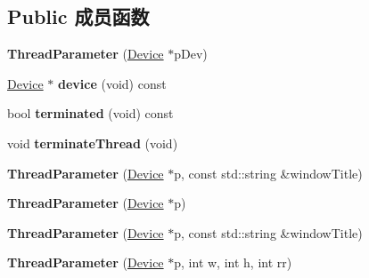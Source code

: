 \subsection*{Public 成员函数}
\begin{DoxyCompactItemize}
\item 
\hypertarget{class_thread_parameter_a6edf848dbdf591e4db2547f0054c5193}{{\bfseries Thread\+Parameter} (\hyperlink{classmv_i_m_p_a_c_t_1_1acquire_1_1_device}{Device} $\ast$p\+Dev)}\label{class_thread_parameter_a6edf848dbdf591e4db2547f0054c5193}

\item 
\hypertarget{class_thread_parameter_ac48ad62142c3b8cdd55ae2f7123c99e9}{\hyperlink{classmv_i_m_p_a_c_t_1_1acquire_1_1_device}{Device} $\ast$ {\bfseries device} (void) const }\label{class_thread_parameter_ac48ad62142c3b8cdd55ae2f7123c99e9}

\item 
\hypertarget{class_thread_parameter_a1a753f10efa4752c2107638e55246d6f}{bool {\bfseries terminated} (void) const }\label{class_thread_parameter_a1a753f10efa4752c2107638e55246d6f}

\item 
\hypertarget{class_thread_parameter_a3e64d0f2b1532d5541ca2f2f7b11bf7c}{void {\bfseries terminate\+Thread} (void)}\label{class_thread_parameter_a3e64d0f2b1532d5541ca2f2f7b11bf7c}

\item 
\hypertarget{class_thread_parameter_a7ee6c265e2dbf9af147ae445fe0e5db0}{{\bfseries Thread\+Parameter} (\hyperlink{classmv_i_m_p_a_c_t_1_1acquire_1_1_device}{Device} $\ast$p, const std\+::string \&window\+Title)}\label{class_thread_parameter_a7ee6c265e2dbf9af147ae445fe0e5db0}

\item 
\hypertarget{class_thread_parameter_ac41528a985c6995279f9750da91a70fd}{{\bfseries Thread\+Parameter} (\hyperlink{classmv_i_m_p_a_c_t_1_1acquire_1_1_device}{Device} $\ast$p)}\label{class_thread_parameter_ac41528a985c6995279f9750da91a70fd}

\item 
\hypertarget{class_thread_parameter_a7ee6c265e2dbf9af147ae445fe0e5db0}{{\bfseries Thread\+Parameter} (\hyperlink{classmv_i_m_p_a_c_t_1_1acquire_1_1_device}{Device} $\ast$p, const std\+::string \&window\+Title)}\label{class_thread_parameter_a7ee6c265e2dbf9af147ae445fe0e5db0}

\item 
\hypertarget{class_thread_parameter_a783ffa7d1f5e38cd39ee5841cd190586}{{\bfseries Thread\+Parameter} (\hyperlink{classmv_i_m_p_a_c_t_1_1acquire_1_1_device}{Device} $\ast$p, int w, int h, int rr)}\label{class_thread_parameter_a783ffa7d1f5e38cd39ee5841cd190586}

\end{DoxyCompactItemize}

